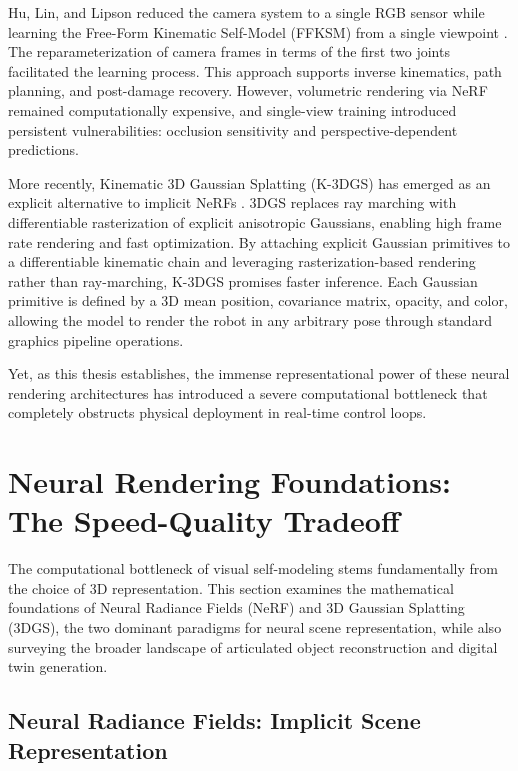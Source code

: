 \documentclass[12pt,a4paper,oneside]{report}
\begin{document}
Hu, Lin, and Lipson reduced the camera system to a single RGB sensor while learning the Free-Form Kinematic Self-Model (FFKSM) from a single viewpoint \cite{hu2024teaching}. The reparameterization of camera frames in terms of the first two joints facilitated the learning process. This approach supports inverse kinematics, path planning, and post-damage recovery. However, volumetric rendering via NeRF remained computationally expensive, and single-view training introduced persistent vulnerabilities: occlusion sensitivity and perspective-dependent predictions.

More recently, Kinematic 3D Gaussian Splatting (K-3DGS) has emerged as an explicit alternative to implicit NeRFs \cite{hu2025learning}. 3DGS replaces ray marching with differentiable rasterization of explicit anisotropic Gaussians, enabling high frame rate rendering and fast optimization. By attaching explicit Gaussian primitives to a differentiable kinematic chain and leveraging rasterization-based rendering rather than ray-marching, K-3DGS promises faster inference. Each Gaussian primitive is defined by a 3D mean position, covariance matrix, opacity, and color, allowing the model to render the robot in any arbitrary pose through standard graphics pipeline operations.

Yet, as this thesis establishes, the immense representational power of these neural rendering architectures has introduced a severe computational bottleneck that completely obstructs physical deployment in real-time control loops.

\section{Neural Rendering Foundations: The Speed-Quality Tradeoff}



The computational bottleneck of visual self-modeling stems fundamentally from the choice of 3D representation. This section examines the mathematical foundations of Neural Radiance Fields (NeRF) and 3D Gaussian Splatting (3DGS), the two dominant paradigms for neural scene representation, while also surveying the broader landscape of articulated object reconstruction and digital twin generation.

\subsection{Neural Radiance Fields: Implicit Scene Representation}
\end{document}
